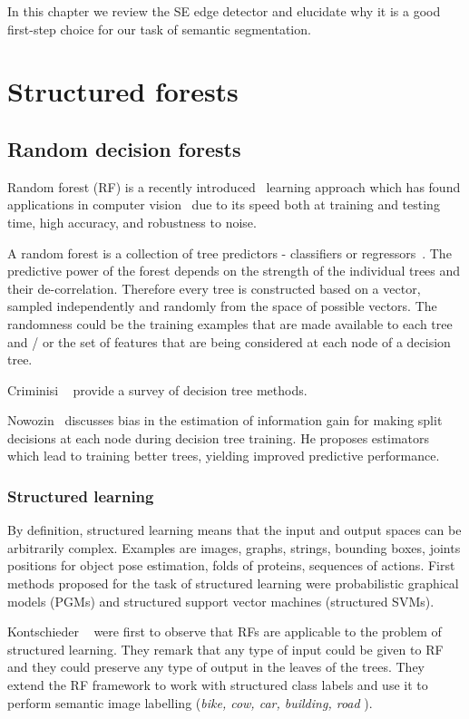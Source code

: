 In this chapter we review the SE edge detector and elucidate why it is a good first-step choice for our task of semantic segmentation.

\section{Structured forests}
\subsection*{Random decision forests}
Random forest (RF) is a recently introduced~\cite{Breiman01} learning approach which has found applications in computer vision~\cite{KontschiederBBP11,LimZD13,DollarICCV13edges,Dollar2014fast} due to its speed both at training and testing time, high accuracy, and robustness to noise.

A random forest is a collection %
of tree predictors - classifiers or regressors~\cite{breiman1984classification}.
The predictive power of the forest depends on the strength of the individual trees and their de-correlation. Therefore every tree is constructed based on a vector, sampled independently and randomly from the space of possible vectors. The randomness could be \wrt the training examples that are made available to each tree and / or the set of features that are being considered at each node of a decision tree.

Criminisi \etal~\cite{Criminisi12} provide a survey of decision tree methods.

Nowozin~\cite{Nowozin12improvedinformation,nowozin2014decision} discusses bias in the estimation of information gain for making split decisions at each node during decision tree training. He proposes estimators which lead to training better trees, yielding improved predictive performance.

\subsubsection*{Structured learning}
By definition, structured learning means that the input and output spaces can be arbitrarily complex. Examples are images, graphs, strings, bounding boxes, joints positions for object pose estimation, folds of proteins, sequences of actions. First methods proposed for the task of structured learning were probabilistic graphical models (PGMs) and structured support vector machines (structured SVMs).

Kontschieder \etal~\cite{KontschiederBBP11} were first to observe that RFs are applicable to the problem of structured learning. They remark that any type of input could be given to RF and they could preserve %
any type of output in the leaves of the trees. They extend the RF framework to work with structured class labels and use it to perform semantic image labelling (\textit{bike, cow, car, building, road \etc}).

